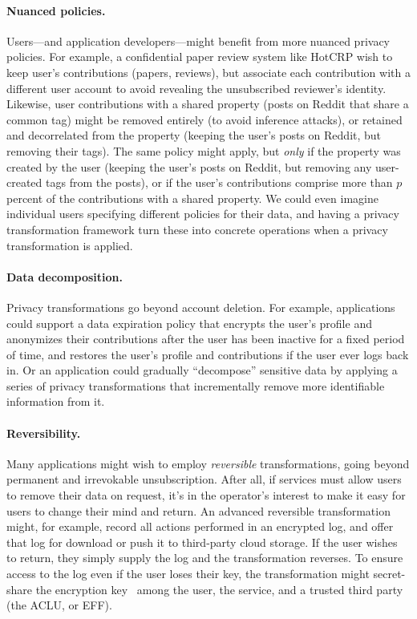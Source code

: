 \paragraph{Nuanced policies.}
%
Users---and application developers---might benefit from more nuanced privacy policies.
%
For example, a confidential paper review system like HotCRP wish to keep user's contributions
(papers, reviews), but associate each contribution with a different user account to avoid
revealing the unsubscribed reviewer's identity.
%
Likewise, user contributions with a shared property (\eg posts on Reddit that share a common tag)
might be removed entirely (to avoid inference attacks), or retained and decorrelated from the
property (\eg keeping the user's posts on Reddit, but removing their tags).
%
The same policy might apply, but \emph{only} if the property was created by the user (\eg keeping
the user's posts on Reddit, but removing any user-created tags from the posts), or if the user's
contributions comprise more than $p$ percent of the contributions with a shared property.
%
We could even imagine individual users specifying different policies for their data, and having a
privacy transformation framework turn these into concrete operations when a privacy transformation
is applied.
%

\paragraph{Data decomposition.}
%
Privacy transformations go beyond account deletion.
%
For example, applications could support a data expiration policy that encrypts the user's
profile and anonymizes their contributions after the user has been inactive for a fixed period of
time, and restores the user's profile and contributions if the user ever logs back in.
%
Or an application could gradually ``decompose'' sensitive data by applying a series of
privacy transformations that incrementally remove more identifiable information from it.
%


\paragraph{Reversibility.}
%
Many applications might wish to employ \emph{reversible} transformations, going beyond permanent
and irrevokable unsubscription.
%
After all, if services must allow users to remove their data on request, it's in the operator's
interest to make it easy for users to change their mind and return.
%
An advanced reversible transformation might, for example, record all actions performed in an
encrypted log, and offer that log for download or push it to third-party cloud storage.
%
If the user wishes to return, they simply supply the log and the transformation reverses.
%
To ensure access to the log even if the user loses their key, the transformation might
secret-share the encryption key~\cite{secretsharing} among the user, the service, and a trusted
third party (\eg the ACLU, or EFF).
%




